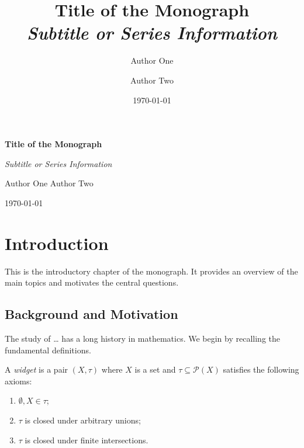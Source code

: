 \documentclass[letterpaper,12pt,oneside,openany]{memoir}
\title{%
  \Huge\bfseries Title of the Monograph\\[0.5cm]
  \Large\itshape Subtitle or Series Information%
}
\author{Author One \and Author Two}
\date{\today}
\begin{document}
\frontmatter

\begin{titlingpage}
  \centering
  \vspace*{4cm}
  {\Huge\bfseries Title of the Monograph\par}
  \vspace{1cm}
  {\Large\itshape Subtitle or Series Information\par}
  \vspace{3cm}
  {\large Author One \quad Author Two\par}
  \vfill
  {\large \today\par}
\end{titlingpage}

\tableofcontents*
\clearpage

\mainmatter

\chapter{Introduction}\label{cha:introduction}

This is the introductory chapter of the monograph.
It provides an overview of the main topics and motivates the central questions.

\section{Background and Motivation}\label{sec:background-motivation}

The study of \ldots{} has a long history in mathematics.
We begin by recalling the fundamental definitions.

\begin{definition}\label{def:fundamental-concept}
  A \emph{widget} is a pair $(X, \tau)$ where $X$ is a set and
  $\tau \subseteq \mathcal{P}(X)$ satisfies the following axioms:
  \begin{enumerate}
  \item
    $\emptyset, X \in \tau$;
  \item
    $\tau$ is closed under arbitrary unions;
  \item
    $\tau$ is closed under finite intersections.
  \end{enumerate}
\end{definition}
\end{document}
